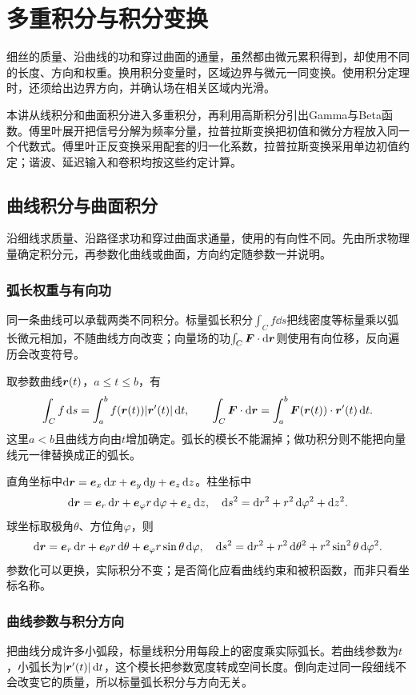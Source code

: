 \chapter{多重积分与积分变换}\label{ch:c4}

细丝的质量、沿曲线的功和穿过曲面的通量，虽然都由微元累积得到，却使用不同的长度、方向和权重。换用积分变量时，区域边界与微元一同变换。使用积分定理时，还须给出边界方向，并确认场在相关区域内光滑。

本讲从线积分和曲面积分进入多重积分，再利用高斯积分引出Gamma与Beta函数。傅里叶展开把信号分解为频率分量，拉普拉斯变换把初值和微分方程放入同一个代数式。傅里叶正反变换采用配套的归一化系数，拉普拉斯变换采用单边初值约定；谐波、延迟输入和卷积均按这些约定计算。


\section{曲线积分与曲面积分}\label{sec:c4-line}
沿细线求质量、沿路径求功和穿过曲面求通量，使用的有向性不同。先由所求物理量确定积分元，再参数化曲线或曲面，方向约定随参数一并说明。

\subsection{弧长权重与有向功}
同一条曲线可以承载两类不同积分。标量弧长积分$\int_Cf\dd s$把线密度等标量乘以弧长微元相加，不随曲线方向改变；向量场的功$\int_C\bm{F}\cdot\mathop{}\!\mathrm d\bm{r}$则使用有向位移，反向遍历会改变符号。

取参数曲线$\bm{r}(t)$，$a\le t\le b$，有
\[\int_C f\mathop{}\!\mathrm d s=\int_a^b f(\bm{r}(t))|\bm{r}'(t)|\mathop{}\!\mathrm d t,\qquad
\int_C\bm{F}\cdot\mathop{}\!\mathrm d\bm{r}=\int_a^b\bm{F}(\bm{r}(t))\cdot\bm{r}'(t)\mathop{}\!\mathrm d t.
\]
这里$a<b$且曲线方向由$t$增加确定。弧长的模长不能漏掉；做功积分则不能把向量线元一律替换成正的弧长。

直角坐标中$\mathop{}\!\mathrm d\bm{r}=\bm{e}_x\mathop{}\!\mathrm d x+\bm{e}_y\mathop{}\!\mathrm d y+\bm{e}_z\mathop{}\!\mathrm d z$。柱坐标中
\[\dd\vct r=\vct e_r\dd r+\vct e_\varphi r\dd\varphi+\vct e_z\dd z,\quad
\dd s^2=\dd r^2+r^2\dd\varphi^2+\dd z^2.
\]
球坐标取极角$\theta$、方位角$\varphi$，则
\[\dd\vct r=\vct e_r\dd r+\vct e_\theta r\dd\theta+\vct e_\varphi r\sin\theta\dd\varphi,
\quad\dd s^2=\dd r^2+r^2\dd\theta^2+r^2\sin^2\theta\dd\varphi^2.
\]
参数化可以更换，实际积分不变；是否简化应看曲线约束和被积函数，而非只看坐标名称。

\subsection{曲线参数与积分方向}
把曲线分成许多小弧段，标量线积分用每段上的密度乘实际弧长。若曲线参数为$t$，小弧长为$|\bm{r}'(t)|\mathop{}\!\mathrm d t$，这个模长把参数宽度转成空间长度。倒向走过同一段细线不会改变它的质量，所以标量弧长积分与方向无关。

